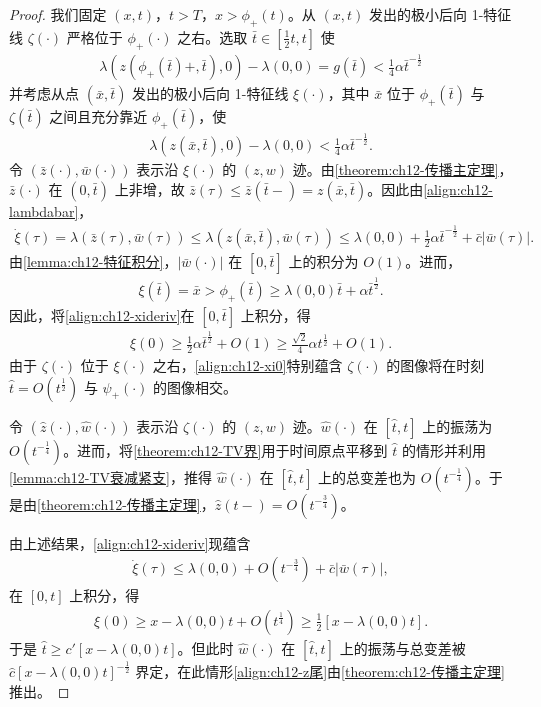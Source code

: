 \documentclass[../../main.tex]{subfiles}
\begin{document}
\begin{proof}
我们固定 $(x,t)$，$t>T$，$x>\phi_+(t)$。从 $(x,t)$ 发出的极小后向 1-特征线 $\zeta(\cdot)$ 严格位于 $\phi_+(\cdot)$ 之右。选取 $\bar t\in[\frac12t,t]$ 使
\begin{align}
\lambda(z(\phi_+(\bar t)+,\bar t),0)-\lambda(0,0)=g(\bar t)<\frac14\alpha\bar t^{-\frac12}
\label{align:ch12-gbar}
\end{align}
并考虑从点 $(\bar x,\bar t)$ 发出的极小后向 1-特征线 $\xi(\cdot)$，其中 $\bar x$ 位于 $\phi_+(\bar t)$ 与 $\zeta(\bar t)$ 之间且充分靠近 $\phi_+(\bar t)$，使
\begin{align}
\lambda(z(\bar x,\bar t),0)-\lambda(0,0)<\frac14\alpha\bar t^{-\frac12}.
\label{align:ch12-lambdabar}
\end{align}
令 $(\bar z(\cdot),\bar w(\cdot))$ 表示沿 $\xi(\cdot)$ 的 $(z,w)$ 迹。由\cref{theorem:ch12-传播主定理}，$\bar z(\cdot)$ 在 $(0,\bar t)$ 上非增，故 $\bar z(\tau)\leqslant\bar z(\bar t-)=z(\bar x,\bar t)$。因此由\eqref{align:ch12-lambdabar}，
\begin{align}
\dot\xi(\tau)=\lambda(\bar z(\tau),\bar w(\tau))\leqslant\lambda(z(\bar x,\bar t),\bar w(\tau))
\leqslant\lambda(0,0)+\frac12\alpha\bar t^{-\frac12}+\bar c|\bar w(\tau)|.
\label{align:ch12-xideriv}
\end{align}
由\cref{lemma:ch12-特征积分}，$|\bar w(\cdot)|$ 在 $[0,\bar t]$ 上的积分为 $O(1)$。进而，
\begin{align}
\xi(\bar t)=\bar x>\phi_+(\bar t)\geqslant\lambda(0,0)\bar t+\alpha\bar t^{\frac12}.
\label{align:ch12-xibar}
\end{align}
因此，将\eqref{align:ch12-xideriv}在 $[0,\bar t]$ 上积分，得
\begin{align}
\xi(0)\geqslant\frac12\alpha\bar t^{\frac12}+O(1)\geqslant\frac{\sqrt2}{4}\alpha t^{\frac12}+O(1).
\label{align:ch12-xi0}
\end{align}
由于 $\zeta(\cdot)$ 位于 $\xi(\cdot)$ 之右，\eqref{align:ch12-xi0}特别蕴含 $\zeta(\cdot)$ 的图像将在时刻 $\hat t=O(t^{\frac12})$ 与 $\psi_+(\cdot)$ 的图像相交。

令 $(\hat z(\cdot),\hat w(\cdot))$ 表示沿 $\zeta(\cdot)$ 的 $(z,w)$ 迹。$\hat w(\cdot)$ 在 $[\hat t,t]$ 上的振荡为 $O(t^{-\frac14})$。进而，将\cref{theorem:ch12-TV界}用于时间原点平移到 $\hat t$ 的情形并利用\cref{lemma:ch12-TV衰减紧支}，推得 $\hat w(\cdot)$ 在 $[\hat t,t]$ 上的总变差也为 $O(t^{-\frac14})$。于是由\cref{theorem:ch12-传播主定理}，$\hat z(t-)=O(t^{-\frac34})$。

由上述结果，\eqref{align:ch12-xideriv}现蕴含
\begin{align}
\dot\xi(\tau)\leqslant\lambda(0,0)+O(t^{-\frac34})+\bar c|\bar w(\tau)|,
\label{align:ch12-xideriv2}
\end{align}
在 $[0,t]$ 上积分，得
\begin{align}
\xi(0)\geqslant x-\lambda(0,0)t+O(t^{\frac14})\geqslant\frac12[x-\lambda(0,0)t].
\label{align:ch12-xi02}
\end{align}
于是 $\hat t\geqslant c'[x-\lambda(0,0)t]$。但此时 $\hat w(\cdot)$ 在 $[\hat t,t]$ 上的振荡与总变差被 $\hat c[x-\lambda(0,0)t]^{-\frac12}$ 界定，在此情形\eqref{align:ch12-z尾}由\cref{theorem:ch12-传播主定理}推出。


\end{proof}
\end{document}
